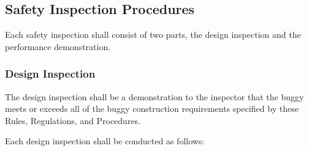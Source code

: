 \subsection{Safety Inspection Procedures}

	Each safety inspection shall consist of two parts, the design inspection and
	the performance demonstration.

\subsubsection{Design Inspection}

	The design inspection shall be a demonstration to the inspector that the buggy
	meets or exceeds all of the buggy construction requirements specified by these
	Rules, Regulations, and Procedures.
	\newline

	\noindent Each design inspection shall be conducted as follows:

